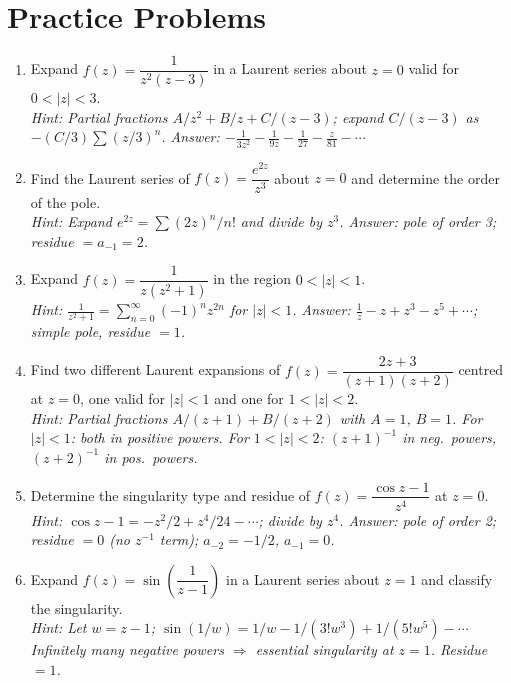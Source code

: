 \documentclass[12pt,a4paper]{article}
\begin{document}
\section{Practice Problems}

\begin{enumerate}[label=\textbf{P\arabic*.}]

\item Expand $f(z) = \dfrac{1}{z^2(z-3)}$ in a Laurent series about $z=0$ valid for
      $0 < |z| < 3$.\\
      \textit{Hint: Partial fractions $A/z^2 + B/z + C/(z-3)$; expand $C/(z-3)$ as $-(C/3)\sum(z/3)^n$.
      Answer: $-\frac{1}{3z^2} - \frac{1}{9z} - \frac{1}{27} - \frac{z}{81} - \cdots$}

\item Find the Laurent series of $f(z) = \dfrac{e^{2z}}{z^3}$ about $z=0$ and determine
      the order of the pole.\\
      \textit{Hint: Expand $e^{2z}=\sum(2z)^n/n!$ and divide by $z^3$.
      Answer: pole of order 3; residue $= a_{-1} = 2$.}

\item Expand $f(z) = \dfrac{1}{z(z^2+1)}$ in the region $0 < |z| < 1$.\\
      \textit{Hint: $\frac{1}{z^2+1} = \sum_{n=0}^{\infty}(-1)^n z^{2n}$ for $|z|<1$.
      Answer: $\frac{1}{z} - z + z^3 - z^5 + \cdots$; simple pole, residue $= 1$.}

\item Find two different Laurent expansions of $f(z) = \dfrac{2z+3}{(z+1)(z+2)}$
      centred at $z=0$, one valid for $|z|<1$ and one for $1<|z|<2$.\\
      \textit{Hint: Partial fractions $A/(z+1)+B/(z+2)$ with $A=1$, $B=1$.
      For $|z|<1$: both in positive powers. For $1<|z|<2$: $(z+1)^{-1}$ in neg.\ powers, $(z+2)^{-1}$ in pos.\ powers.}

\item Determine the singularity type and residue of $f(z) = \dfrac{\cos z - 1}{z^4}$ at $z=0$.\\
      \textit{Hint: $\cos z - 1 = -z^2/2 + z^4/24 - \cdots$; divide by $z^4$.
      Answer: pole of order 2; residue $= 0$ (no $z^{-1}$ term); $a_{-2}=-1/2$, $a_{-1}=0$.}

\item Expand $f(z) = \sin\!\left(\dfrac{1}{z-1}\right)$ in a Laurent series about $z=1$
      and classify the singularity.\\
      \textit{Hint: Let $w=z-1$; $\sin(1/w)=1/w - 1/(3!w^3)+1/(5!w^5)-\cdots$
      Infinitely many negative powers $\Rightarrow$ essential singularity at $z=1$. Residue $= 1$.}

\end{enumerate}
\end{document}
